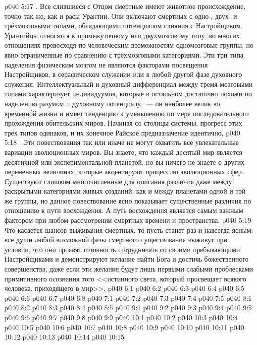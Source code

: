 \vs p040 5:17 \pc {}. Все слившиеся с Отцом смертные имеют животное происхождение, точно так же, как и расы Урантии. Они включают смертных с одно\hyp{}, двух\hyp{} и трёхмозговыми типами, обладающими потенциалом слияния с Настройщиком. Урантийцы относятся к промежуточному или двухмозговому типу, во многих отношениях превосходя по человеческим возможностям одномозговые группы, но явно ограниченные по сравнению с трёхмозговыми категориями. Эти три типа наделения физическим мозгом не являются факторами посвящения Настройщиков, в серафическом служении или в любой другой фазе духовного служения. Интеллектуальный и духовный дифференциал между тремя мозговыми типами характеризует индивидуумов, которые в остальном достаточно похожи по наделению разумом и духовному потенциалу,~--- он наиболее велик во временн\'ой жизни и имеет тенденцию к уменьшению по мере последовательного прохождения обительских миров. Начиная со столицы системы, прогресс этих трёх типов одинаков, и их конечное Райское предназначение идентично.
\vs p040 5:18 \pc {}. Эти повествования так или иначе не могут охватить все увлекательные вариации эволюционных миров. Вы знаете, что каждый десятый мир является десятичной или экспериментальной планетой, но вы ничего не знаете о других переменных величинах, которые акцентируют процессию эволюционных сфер. Существуют слишком многочисленные для описания различия даже между раскрытыми категориями живых созданий, как и между планетами одной и той же группы, но данное повествование ясно показывает существенные различия по отношению к пути восхождения. А путь восхождения является самым важным фактором при любом рассмотрении смертных времени и пространства.
\vs p040 5:19 \pc Что касается шансов выживания смертных, то пусть станет раз и навсегда ясным: все души любой возможной фазы смертного существования выживут при условии, что они проявят готовность сотрудничать со своими пребывающими Настройщиками и демонстрируют желание найти Бога и достичь божественного совершенства, даже если эти желания будут лишь первыми слабыми проблесками примитивного осознания того <<истинного света, который просвещает всякого человека, приходящего в мир>>.
\vs p040 6:1 
\vs p040 6:2 
\vs p040 6:3 
\vs p040 6:4 
\vs p040 6:5 
\vs p040 6:6 
\vs p040 6:7 
\vs p040 6:8 
\vs p040 7:1 
\vs p040 7:2 
\vs p040 7:3 
\vs p040 7:4 
\vs p040 7:5 
\vs p040 8:1 
\vs p040 8:2 
\vs p040 8:3 
\vs p040 8:4 \pc 
\vs p040 8:5 
\vs p040 9:1 
\vs p040 9:2 \pc 
\vs p040 9:3 
\vs p040 9:4 \pc 
\vs p040 9:5 
\vs p040 9:6 
\vs p040 9:7 
\vs p040 9:8 \pc 
\vs p040 9:9 \pc 
{}
\vs p040 10:1 
\vs p040 10:2 
\vs p040 10:3 \pc 
\vs p040 10:4 
\vs p040 10:5 \pc 
\vs p040 10:6 \pc 
\vs p040 10:7 
\vs p040 10:8 \pc 
\vs p040 10:9 \pc 
\vs p040 10:10 
\vs p040 10:11 
\vs p040 10:12 
\vs p040 10:13 \pc 
\vs p040 10:14 
\vsetoff
\vs p040 10:15 
\quizlink
